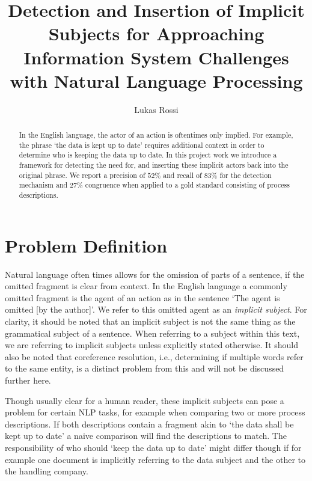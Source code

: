 \documentclass[times, 10pt,twocolumn]{article}
\begin{document}
\title{Detection and Insertion of Implicit Subjects for Approaching Information System Challenges with Natural Language Processing}

\author{Lukas Rossi}

\maketitle
\thispagestyle{empty}

\begin{abstract}
   In the English language, the actor of an action is oftentimes only implied.
   For example, the phrase `the data is kept up to date' requires additional context in order
   to determine who is keeping the data up to date. In this project work we introduce
   a framework for detecting the need for, and inserting these implicit actors back into
   the original phrase. We report a precision of \(52\%\) and recall of \(83\%\) for
   the detection mechanism and \(27\%\) congruence when applied to a gold standard consisting
   of process descriptions.
\end{abstract}



\section{Problem Definition}
Natural language often times allows for the omission of parts of a sentence,
if the omitted fragment is clear from context. In the English language a
commonly omitted fragment is the agent of an action as in the sentence
`The agent is omitted [by the author]'. We refer to this omitted agent as
an \textit{implicit subject}. For clarity, it should be noted that an implicit
subject is not the same thing as the grammatical subject of a sentence. When referring
to a subject within this text, we are referring to implicit subjects unless explicitly
stated otherwise. It should
also be noted that coreference resolution, i.e., determining if multiple words
refer to the same entity, is a distinct problem from this and will not be
discussed further here. 

Though usually clear for a human reader, these implicit subjects can pose a problem
for certain NLP tasks, for example when comparing two or more process descriptions.
If both descriptions contain a fragment akin to `the data shall be kept up to date'
a naive comparison will find the descriptions to match. The responsibility of who
should `keep the data up to date' might differ though if for example one document
is implicitly referring to the data subject and the other to the handling company.
\end{document}
